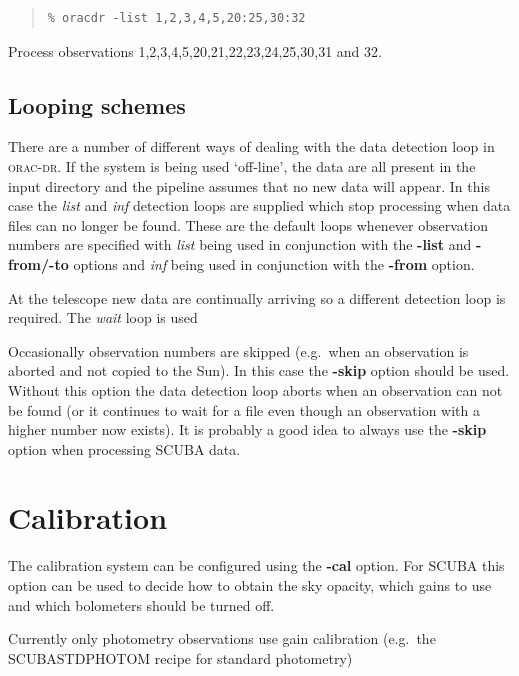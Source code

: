 \documentclass[twoside,11pt]{article}
\newcommand{\xref}[3]{#1}
\newcommand{\xlabel}[1]{}
\renewcommand{\_}{\texttt{\symbol{95}}}
\newcommand{\oracdr}{\xref{\textsc{orac-dr}}{sun230}{}}
\newcommand{\recipe}[1]{{\small\textsf{#1}}}
\newenvironment{myquote}{\begin{quote}\begin{small}}{\end{small}\end{quote}}
\begin{document}
\begin{myquote}
\begin{verbatim}
% oracdr -list 1,2,3,4,5,20:25,30:32
\end{verbatim}
\end{myquote}
Process observations 1,2,3,4,5,20,21,22,23,24,25,30,31 and 32.

\subsection{Looping schemes\xlabel{looping_schemes}}

There are a number of different ways of dealing with the data detection
loop in \oracdr. If the system is being used `off-line', the data are
all present in the input directory and the pipeline assumes that no new
data will appear. In this case the \textit{list} and \textit{inf} detection
loops are supplied which stop processing when data files can no longer 
be found. These are the default loops whenever observation 
numbers are specified with \textit{list} being used in conjunction with the
\textbf{-list} and \textbf{-from/-to} options and \textit{inf} being
used in conjunction with the \textbf{-from} option.

At the telescope new data are continually arriving so a different detection
loop is required. The \textit{wait} loop is used 

Occasionally observation numbers are skipped (e.g.\ when an observation is
aborted and not copied to the Sun). In this case the \textbf{-skip} option
should be used. Without this option the data detection loop aborts when
an observation can not be found (or it continues to wait for a file even
though an observation with a higher number now exists).
It is probably a good idea to always use the \textbf{-skip}
option when processing SCUBA data.


\section{Calibration\label{sec:cal}\xlabel{calibration}}

The calibration system can be configured using the \textbf{-cal} option.
For SCUBA this option can be used to decide how to obtain the sky opacity,
which gains to use and which bolometers should be turned off.

Currently only photometry observations use gain calibration (e.g.\ the
\recipe{SCUBA\_STD\_PHOTOM} recipe for standard photometry)
\end{document}
